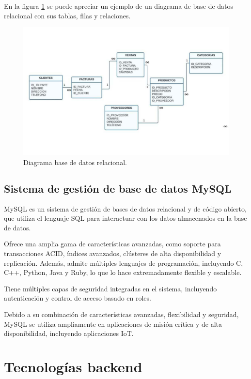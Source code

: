 En la figura \ref{fig:relddbb} se puede apreciar un ejemplo de un diagrama de base de datos relacional con sus tablas, filas y relaciones.

\begin{figure}[ht]
	\centering
	\includegraphics[scale=.30]{./Figures/relddbb.jpg}
	\caption{Diagrama base de datos relacional.}
	\label{fig:relddbb}
\end{figure}

\subsection{Sistema de gestión de base de datos MySQL}
\label{subsec:mysql}

MySQL \citep{WEBSITE:mysql-site} es un sistema de gestión de bases de datos relacional y de código abierto, que utiliza el lenguaje SQL para interactuar con los datos almacenados en la base de datos. 

Ofrece una amplia gama de características avanzadas, como soporte para transacciones ACID, índices avanzados, clústeres de alta disponibilidad y replicación. Además, admite múltiples lenguajes de programación, incluyendo C, C++, Python, Java y Ruby, lo que lo hace extremadamente flexible y escalable.

Tiene múltiples capas de seguridad integradas en el sistema, incluyendo autenticación y control de acceso basado en roles. 

Debido a su combinación de características avanzadas, flexibilidad y seguridad, MySQL se utiliza ampliamente en aplicaciones de misión crítica y de alta disponibilidad, incluyendo aplicaciones IoT.

\section{Tecnologías backend}
\label{sec:backend}

